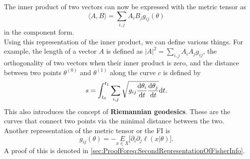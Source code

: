 The inner product of two vectors can now be expressed with the metric tensor as
\begin{equation}
	\langle A,B \rangle = \sum_{i,j} A_iB_jg_{ij}(\theta)
\end{equation}
in the component form. \\
Using this representation of the inner product, we can define various things. For example, the length of a vector $A$ is defined as $|A|^2 = \sum_{i,j} A_iA_j g_{ij}$, the orthogonality of two vectors when their inner product is zero, and the distance between two points $\theta^{(0)}$ and $\theta^{(1)}$ along the curve $c$ is defined by 
\begin{equation}
	s = \int_{t_0}^{t_1} \sum_{i,j} \sqrt{g_{ij}\frac{\mathrm{d}\theta_i}{\mathrm{d}t}\frac{\mathrm{d}\theta_j}{\mathrm{d}t}} \mathrm{d}t. 
\end{equation}
This also introduces the concept of \textbf{Riemannian geodesics}. These are the curves that connect two points via the minimal distance between the two.\\
Another representation of the metric tensor or the FI is 
\begin{equation}\label{eq:SecondRepresentationOfFisherInfo}
	g_{ij}(\theta) = - \underset{x\in X}{E} \Big[ \partial_i \partial_j \ell(x|\theta) \Big].
\end{equation}
A proof of this is denoted in \cref{sec:ProofForeq:SecondRepresentationOfFisherInfo}.